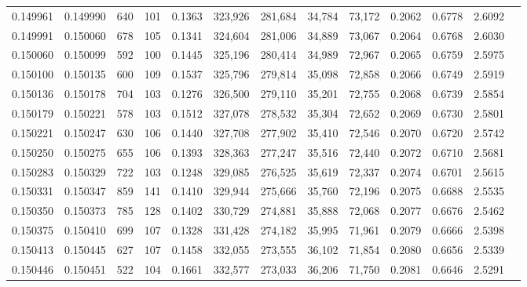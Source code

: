 \begin{tabular}{rrrrrrrrrrrrr}
0.149961 & 0.149990 &   640 & 101 &                                     0.1363 & 323,926 & 281,684 &  34,784 &  73,172 & 0.2062 & 0.6778 & 2.6092 \\
0.149991 & 0.150060 &   678 & 105 &                                     0.1341 & 324,604 & 281,006 &  34,889 &  73,067 & 0.2064 & 0.6768 & 2.6030 \\
0.150060 & 0.150099 &   592 & 100 &                                     0.1445 & 325,196 & 280,414 &  34,989 &  72,967 & 0.2065 & 0.6759 & 2.5975 \\
0.150100 & 0.150135 &   600 & 109 &                                     0.1537 & 325,796 & 279,814 &  35,098 &  72,858 & 0.2066 & 0.6749 & 2.5919 \\
0.150136 & 0.150178 &   704 & 103 &                                     0.1276 & 326,500 & 279,110 &  35,201 &  72,755 & 0.2068 & 0.6739 & 2.5854 \\
0.150179 & 0.150221 &   578 & 103 &                                     0.1512 & 327,078 & 278,532 &  35,304 &  72,652 & 0.2069 & 0.6730 & 2.5801 \\
0.150221 & 0.150247 &   630 & 106 &                                     0.1440 & 327,708 & 277,902 &  35,410 &  72,546 & 0.2070 & 0.6720 & 2.5742 \\
0.150250 & 0.150275 &   655 & 106 &                                     0.1393 & 328,363 & 277,247 &  35,516 &  72,440 & 0.2072 & 0.6710 & 2.5681 \\
0.150283 & 0.150329 &   722 & 103 &                                     0.1248 & 329,085 & 276,525 &  35,619 &  72,337 & 0.2074 & 0.6701 & 2.5615 \\
0.150331 & 0.150347 &   859 & 141 &                                     0.1410 & 329,944 & 275,666 &  35,760 &  72,196 & 0.2075 & 0.6688 & 2.5535 \\
0.150350 & 0.150373 &   785 & 128 &                                     0.1402 & 330,729 & 274,881 &  35,888 &  72,068 & 0.2077 & 0.6676 & 2.5462 \\
0.150375 & 0.150410 &   699 & 107 &                                     0.1328 & 331,428 & 274,182 &  35,995 &  71,961 & 0.2079 & 0.6666 & 2.5398 \\
0.150413 & 0.150445 &   627 & 107 &                                     0.1458 & 332,055 & 273,555 &  36,102 &  71,854 & 0.2080 & 0.6656 & 2.5339 \\
0.150446 & 0.150451 &   522 & 104 &                                     0.1661 & 332,577 & 273,033 &  36,206 &  71,750 & 0.2081 & 0.6646 & 2.5291 \\

\end{tabular}
